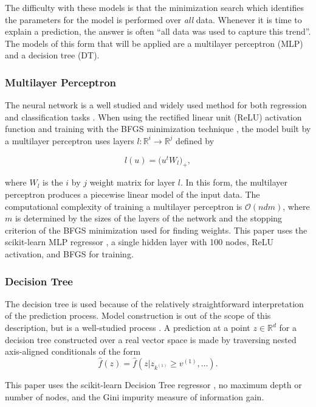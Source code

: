 \documentclass[conference]{IEEEtran}
\begin{document}
The difficulty with these models is that the minimization search which identifies the parameters for the model is performed over \textit{all} data. Whenever it is time to explain a prediction, the answer is often ``all data was used to capture this trend''. The models of this form that will be applied are a multilayer perceptron (MLP) and a decision tree (DT).

\subsubsection{Multilayer Perceptron}

The neural network is a well studied and widely used method for both regression and classification tasks \cite{hornik1989multilayer}. When using the rectified linear unit (ReLU) activation function \cite{dahl2013improving} and training with the BFGS minimization technique \cite{moller1993scaled}, the model built by a multilayer perceptron uses layers $l : \mathbb{R}^{i} \rightarrow \mathbb{R}^{j}$ defined by

$$ l(u) = \big( u^t W_l \big)_+ ,$$

\noindent where $W_l$ is the $i$ by $j$ weight matrix for layer $l$. In this form, the multilayer perceptron produces a piecewise linear model of the input data. The computational complexity of training a multilayer perceptron is $\mathcal{O}(n d m)$, where $m$ is determined by the sizes of the layers of the network and the stopping criterion of the BFGS minimization used for finding weights. This paper uses the scikit-learn MLP regressor \cite{scikit-learn}, a single hidden layer with 100 nodes, ReLU activation, and BFGS for training.

\subsubsection{Decision Tree}

The decision tree is used because of the relatively straightforward interpretation of the prediction process. Model construction is out of the scope of this description, but is a well-studied process \cite{quinlan1986induction}. A prediction at a point $z \in \mathbb{R}^d$ for a decision tree constructed over a real vector space is made by traversing nested axis-aligned conditionals of the form
$$\hat f(z) = \hat f(z | z_{k^{(1)}} \geq v^{(1)}, \ldots).$$

This paper uses the scikit-learn Decision Tree regressor \cite{scikit-learn}, no maximum depth or number of nodes, and the Gini impurity measure of information gain.
\end{document}
